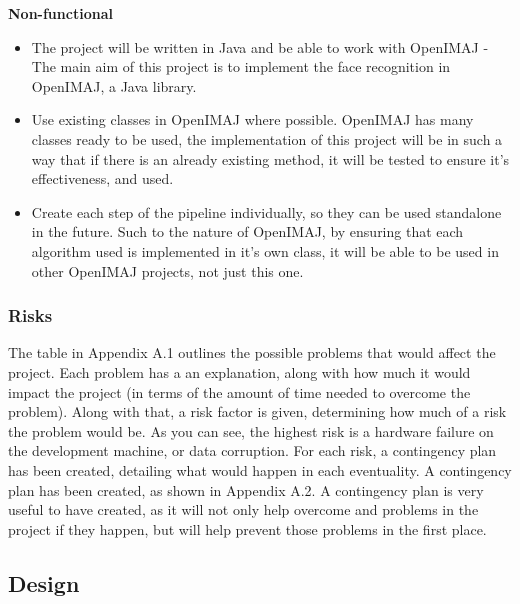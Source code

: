 \documentclass[12pt, a4paper]{article}
\begin{document}
\textbf{Non-functional}
\begin{itemize}
\item The project will be written in Java and be able to work with OpenIMAJ - The main aim of this project is to implement the face recognition in OpenIMAJ, a Java library.
\item Use existing classes in OpenIMAJ where possible. OpenIMAJ has many classes ready to be used, the implementation of this project will be in such a way that if there is an already existing method, it will be tested to ensure it’s effectiveness, and used.
\item Create each step of the pipeline individually, so they can be used standalone in the future. Such to the nature of OpenIMAJ, by ensuring that each algorithm used is implemented in it’s own class, it will be able to be used in other OpenIMAJ projects, not just this one. 
\end{itemize}
\subsubsection{Risks}
The table in Appendix A.1 outlines the possible problems that would affect the project. Each problem has a an explanation, along with how much it would impact the project (in terms of the amount of time needed to overcome the problem). Along with that, a risk factor is given, determining how much of a risk the problem would be. As you can see, the highest risk is a hardware failure on the development machine, or data corruption. For each risk, a contingency plan has been created, detailing what would happen in each eventuality. A contingency plan has been created, as shown in Appendix A.2. A contingency plan is very useful to have created, as it will not only help overcome and problems in the project if they happen, but will help prevent those problems in the first place. 

\subsection{Design}
\end{document}
